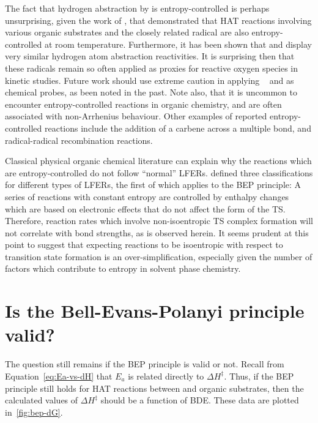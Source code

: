 The fact that hydrogen abstraction by \cumo is entropy-controlled is perhaps unsurprising, given the work of \citet{Finn2004}, that demonstrated that HAT reactions involving various organic substrates and the closely related radical  are also entropy-controlled at room temperature. Furthermore, it has been shown that \cumo and  display very similar hydrogen atom abstraction reactivities.\cite{Salamone2011, Valgimigli1995, Sheeller2001, Baignee1983} It is surprising then that these radicals remain so often applied as proxies for reactive oxygen species in kinetic studies. Future work should use extreme caution in applying \cumo~ and  as chemical probes, as been noted in the past.\cite{Finn2004, Salamone2011b, Salamone2011} Note also, that it is uncommon to encounter entropy-controlled reactions in organic chemistry, and are often associated with non-Arrhenius behaviour. Other examples of reported entropy-controlled reactions include the addition of a carbene across a multiple bond,\cite{Houk1984, Moss2017} and radical-radical recombination reactions.\cite{Sobek2001}

Classical physical organic chemical literature can explain why the reactions which are entropy-controlled do not follow ``normal'' LFERs.\cite{Exner1973} \citet{Blackadder1958} defined three classifications for different types of LFERs, the first of which applies to the BEP principle: A series of reactions with constant entropy are controlled by enthalpy changes which are based on electronic effects that do not affect the form of the TS. Therefore, reaction rates which involve non-isoentropic TS complex formation will not correlate with bond strengths, as is observed herein. It seems prudent at this point to suggest that expecting reactions to be isoentropic with respect to transition state formation is an over-simplification, especially given the number of factors which contribute to entropy in solvent phase chemistry.

\section{Is the Bell-Evans-Polanyi principle valid?}

The question still remains if the BEP principle is valid or not. Recall from Equation~\ref{eq:Ea-vs-dH} that $E_a$ is related directly to $\Delta H^\ddagger$. Thus, if the BEP principle still holds for HAT reactions between \cumo and organic substrates, then the calculated values of $\Delta H^\ddagger$ should be a function of  BDE. These data are plotted in~\ref{fig:bep-dG}.

